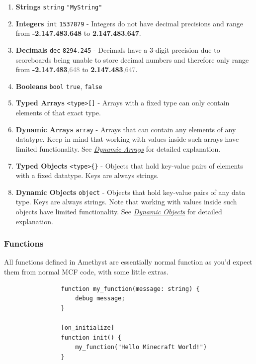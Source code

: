 \documentclass[12pt]{article}
\begin{document}
            \begin{enumerate}[label=\arabic*.,ref=\arabic*]
                \item \textbf{Strings} \lstinline{string} \lstinline{"MyString"}
                \item \textbf{Integers} \lstinline{int} \lstinline{1537879} - Integers do not have decimal precisions and range from \textbf{-2.147.483.648} to \textbf{2.147.483.647}.
                \item \textbf{Decimals} \lstinline{dec} \lstinline{8294.245} - Decimals have a 3-digit precision due to scoreboards being unable to store decimal numbers and therefore only range from \textbf{-2.147.483}\textcolor{gray}{,648} to \textbf{2.147.483}\textcolor{gray}{,647}.
                \item \textbf{Booleans} \lstinline{bool} \lstinline{true}, \lstinline{false}
                \item \textbf{Typed Arrays} \lstinline{<type>[]} - Arrays with a fixed type can only contain elements of that exact type.
                \item \textbf{Dynamic Arrays} \lstinline{array} - Arrays that can contain any elements of any datatype. Keep in mind that working with values inside such arrays have limited functionality. See \textit{\hyperref[datatypes_dynamic_arrays]{Dynamic Arrays}} for detailed explanation.
                \item \textbf{Typed Objects} \lstinline|<type>{}| - Objects that hold key-value pairs of elements with a fixed datatype. Keys are always strings.
                \item \textbf{Dynamic Objects} \lstinline{object} - Objects that hold key-value pairs of any data type. Keys are always strings. Note that working with values inside such objects have limited functionality. See \textit{\hyperref[datatypes_dynamic_objects]{Dynamic Objects}} for detailed explanation.
            \end{enumerate}

            
        \subsubsection{Functions}
            All functions defined in Amethyst are essentially normal function as you'd expect them from normal MCF code, with some little extras.
            \begin{lstlisting}
                function my_function(message: string) {
                    debug message;
                }
                
                [on_initialize]
                function init() {
                    my_function("Hello Minecraft World!")
                }
            \end{lstlisting}
            
\end{document}
